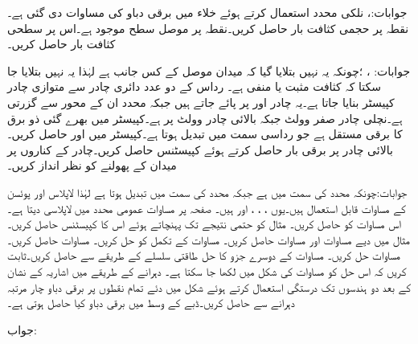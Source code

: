 جوابات:،  
نلکی محدد استعمال کرتے ہوئے خلاء میں برقی دباو کی مساوات  دی گئی ہے۔ نقطہ  پر حجمی کثافت بار  حاصل کریں۔نقطہ  پر موصل سطح موجود ہے۔اس پر سطحی کثافت بار  حاصل کریں۔

جوابات: ، ؛چونکہ یہ نہیں بتلایا گیا کہ میدان موصل کے کس جانب ہے لہٰذا یہ نہیں بتلایا جا سکتا کہ کثافت مثبت یا منفی ہے۔
رداس  کے دو عدد دائری چادر سے متوازی چادر کپیسٹر بنایا جاتا ہے۔یہ چادر  اور  پر پائے جاتے ہیں جبکہ  محدد ان کے محور سے گزرتی ہے۔نچلی چادر صفر وولٹ جبکہ بالائی چادر  وولٹ پر ہے۔کپیسٹر میں بھرے گئی ذو برق کا برقی مستقل  ہے جو رداسی سمت میں تبدیل ہوتا ہے۔کپیسٹر میں  اور  حاصل کریں۔بالائی چادر پر برقی بار حاصل کرتے ہوئے کپیسٹنس حاصل کریں۔چادر کے کناروں پر میدان کے پھولنے کو نظر انداز کریں۔

جوابات:چونکہ   محدد  کی سمت میں ہے جبکہ  محدد  کی سمت میں تبدیل ہوتا ہے لہٰذا لاپلاس اور پوئسن کے مساوات قابل استعمال ہیں۔یوں ،  ، ،  اور  ہیں۔
صفحہ  پر مساوات  عمومی محدد میں لاپلاسی دیتا ہے۔اس مساوات کو حاصل کریں۔
مثال  کو حتمی نتیجے تک پہنچاتے ہوئے اس  کا کپیسٹنس حاصل کریں۔
مثال  میں دیے مساوات  اور مساوات  حاصل کریں۔
مساوات  کے تکمل کو حل کریں۔
مساوات  حاصل کریں۔
مساوات  حل کریں۔
مساوات  کے دوسرے جزو کا حل طاقتی سلسلے کے طریقے سے حاصل کریں۔ثابت کریں کہ اس حل کو مساوات  کی شکل میں لکھا جا سکتا ہے۔
دہرانے کے طریقے میں اشاریہ کے نشان کے بعد دو ہندسوں تک درستگی استعمال کرتے ہوئے شکل  میں دئے تمام نقطوں پر برقی دباو چار مرتبہ دہرانے سے حاصل کریں۔ڈبے کے وسط میں برقی دباو کیا حاصل ہوتی ہے۔

جواب: 
